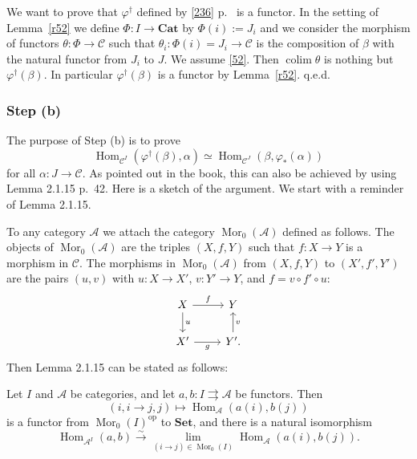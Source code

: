 \documentclass[12pt]{article}%
\theoremstyle{remark}
\theoremstyle{definition}
\newcommand{\A}{\mathcal A}
\newcommand{\C}{\mathcal C}
\newcommand{\Cat}{\mathbf{Cat}}%
\newcommand{\Set}{\mathbf{Set}}
\newcommand{\pp}{\varphi}
\newcommand{\parar}{\rightrightarrows}
\newcommand{\xr}{\xrightarrow}
\DeclareMathOperator*{\colim}{colim}
\DeclareMathOperator{\Hom}{Hom}%
\DeclareMathOperator{\Mor}{Mor}
\DeclareMathOperator{\op}{op}
\begin{document}
We want to prove that $\pp^\dagger$ defined by \eqref{236} p.~\pageref{236} is a functor. In the setting of Lemma~\ref{r52} we define $\Phi:I\to\Cat$ by $\Phi(i):=J_i$ and we consider the morphism of functors $\theta:\Phi\to\C$ such that $\theta_i:\Phi(i)=J_i\to\C$ is the composition of $\beta$ with the natural functor from $J_i$ to $J$. We assume \eqref{52}. Then $\colim\theta$ is nothing but $\varphi^\dagger(\beta)$. In particular $\varphi^\dagger(\beta)$ is a functor by Lemma~\ref{r52}. q.e.d.

%

\subsubsection{Step (b)}

The purpose of Step (b) is to prove 
\begin{equation}\label{stepb}
\Hom_{\C^I}(\varphi^\dagger(\beta),\alpha)\simeq\Hom_{\C^J}(\beta,\varphi_*(\alpha)) 
\end{equation} 
for all $\alpha:J\to\C$. As pointed out in the book, this can also be achieved by using Lemma 2.1.15 p.~42. Here is a sketch of the argument. We start with a reminder of Lemma 2.1.15. 

To any category $\A$ we attach the category $\Mor_0(\A)$ defined as follows. The objects of $\Mor_0(\A)$ are the triples $(X,f,Y)$ such that $f:X\to Y$ is a morphism in $\C$. The morphisms in $\Mor_0(\A)$ from $(X,f,Y)$ to $(X',f',Y')$ are the pairs $(u,v)$ with $u:X\to X'$, $v:Y'\to Y$, and $f=v\circ f'\circ u$:
$$
\begin{tikzcd}
X\ar{d}{u}\ar{r}{f}&Y\\ 
X'\ar{r}[swap]{g}&Y'\ar{u}[swap]{v}.
\end{tikzcd}
$$ 
Then Lemma 2.1.15 can be stated as follows: 

Let $I$ and $\A$ be categories, and let $a,b:I\parar\A$ be functors. Then 
$$
(i,i\to j,j)\mapsto\Hom_\A(a(i),b(j))
$$ 
is a functor from $\Mor_0(I)^{\op}$ to $\Set$, and there is a natural isomorphism 
%
\begin{equation}\label{2115} 
\Hom_{\A^I}(a,b)\xr\sim\lim_{(i\to j)\in\Mor_0(I)}\Hom_\A(a(i),b(j)).
\end{equation}
%
\end{document}
